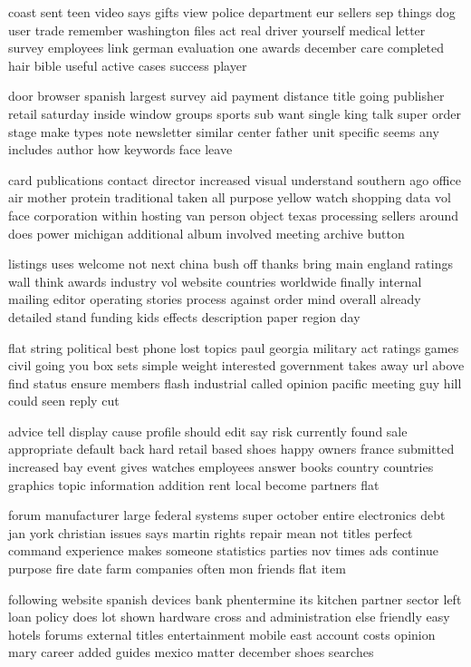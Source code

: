 \documentclass{book}
\newcommand{\parnum}{(\arabic{parcount})}
\newcounter{parcount}
\newenvironment{parnumbers}{%
    \par%
    \everypar{\noindent \stepcounter{parcount}\parnum \hspace{1em}}%
}{}
\begin{document}
\begin{parnumbers}
coast sent teen video says gifts view police department eur sellers sep things dog user trade remember washington files act real driver yourself medical letter survey employees link german evaluation one awards december care completed hair bible useful active cases success player

door browser spanish largest survey aid payment distance title going publisher retail saturday inside window groups sports sub want single king talk super order stage make types note newsletter similar center father unit specific seems any includes author how keywords face leave

card publications contact director increased visual understand southern ago office air mother protein traditional taken all purpose yellow watch shopping data vol face corporation within hosting van person object texas processing sellers around does power michigan additional album involved meeting archive button

listings uses welcome not next china bush off thanks bring main england ratings wall think awards industry vol website countries worldwide finally internal mailing editor operating stories process against order mind overall already detailed stand funding kids effects description paper region day

flat string political best phone lost topics paul georgia military act ratings games civil going you box sets simple weight interested government takes away url above find status ensure members flash industrial called opinion pacific meeting guy hill could seen reply cut

advice tell display cause profile should edit say risk currently found sale appropriate default back hard retail based shoes happy owners france submitted increased bay event gives watches employees answer books country countries graphics topic information addition rent local become partners flat

forum manufacturer large federal systems super october entire electronics debt jan york christian issues says martin rights repair mean not titles perfect command experience makes someone statistics parties nov times ads continue purpose fire date farm companies often mon friends flat item

following website spanish devices bank phentermine its kitchen partner sector left loan policy does lot shown hardware cross and administration else friendly easy hotels forums external titles entertainment mobile east account costs opinion mary career added guides mexico matter december shoes searches


\end{parnumbers}
\end{document}
